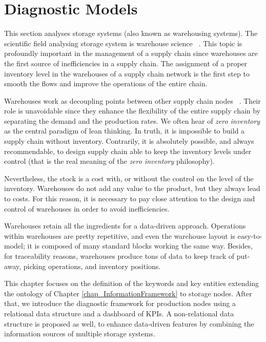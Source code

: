 \chapter{Diagnostic Models}

This section analyses storage systems (also known as warehousing systems). The scientific field analysing storage system is warehouse science ~\cite{Bartholdi2017}. This topic is profoundly important in the management of a supply chain since warehouses are the first source of inefficiencies in a supply chain. The assignment of a proper inventory level in the warehouses of a supply chain network is the first step to smooth the flows and improve the operations of the entire chain.\par

Warehouses work as decoupling points between other supply chain nodes ~\cite{Aguezzoul2014, Selviaridis2007}. Their role is unavoidable since they enhance the flexibility of the entire supply chain by separating the demand and the production rates. We often hear of \textit{zero inventory} as the central paradigm of lean thinking. In truth, it is impossible to build a supply chain without inventory. Contrarily, it is absolutely possible, and always recommendable, to design supply chain able to keep the inventory levels under control (that is the real meaning of the \textit{zero inventory} philosophy). \par

Nevertheless, the stock is a cost with, or without the control on the level of the inventory. Warehouses do not add any value to the product, but they always lead to costs. For this reason, it is necessary to pay close attention to the design and control of warehouses in order to avoid inefficiencies.\par

Warehouses retain all the ingredients for a data-driven approach. Operations within warehouses are pretty repetitive, and even the warehouse layout is easy-to-model; it is composed of many standard blocks working the same way. Besides, for traceability reasons, warehouses produce tons of data to keep track of put-away, picking operations, and inventory positions.\par

This chapter focuses on the definition of the keywords and key entities extending the ontology of Chapter \ref{chap_InformationFramework} to storage nodes. After that, we introduce the diagnostic framework for production nodes using a relational data structure and a dashboard of KPIs. A non-relational data structure is proposed as well, to enhance data-driven features by combining the information sources of multiple storage systems.\par

